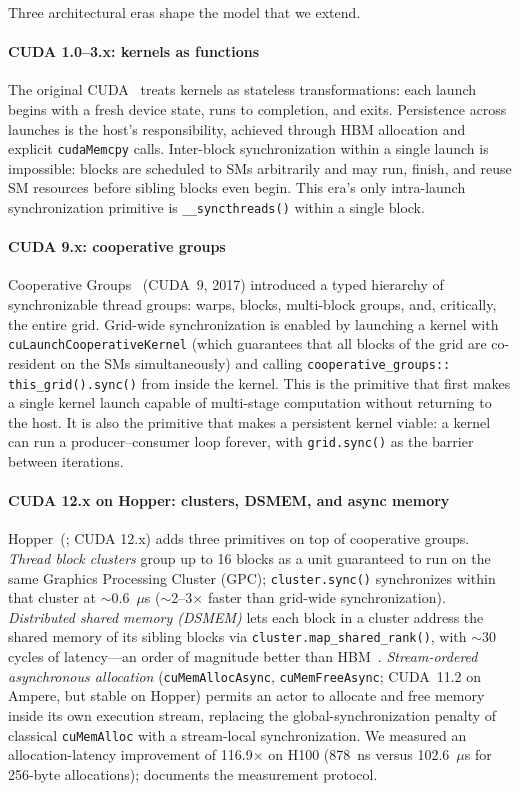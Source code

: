 Three architectural eras shape the model that we extend.

\paragraph{CUDA 1.0--3.x: kernels as functions}
The original CUDA~\citep{nickolls2008cuda} treats kernels as
stateless transformations: each launch begins with a fresh device
state, runs to completion, and exits.  Persistence across launches
is the host's responsibility, achieved through HBM allocation and
explicit \texttt{cudaMemcpy} calls.  Inter-block synchronization
within a single launch is impossible: blocks are scheduled to SMs
arbitrarily and may run, finish, and reuse SM resources before
sibling blocks even begin.  This era's only intra-launch
synchronization primitive is \texttt{\_\_syncthreads()} within a
single block.

\paragraph{CUDA 9.x: cooperative groups}
Cooperative Groups~\citep{nvidia2023cooperative} (CUDA~9, 2017)
introduced a typed hierarchy of synchronizable thread groups:
warps, blocks, multi-block groups, and, critically, the entire
grid.  Grid-wide synchronization is enabled by launching a kernel
with
\texttt{cuLaunch\allowbreak Cooperative\allowbreak Kernel} (which
guarantees that all blocks of the grid are co-resident on the SMs
simultaneously) and calling
\texttt{cooperative\_groups::\allowbreak
this\_grid().sync()} from inside the kernel.  This is the primitive that first makes a single kernel
launch capable of multi-stage computation without returning to the
host.  It is also the primitive that makes a persistent kernel
viable: a kernel can run a producer--consumer loop forever, with
\texttt{grid.sync()} as the barrier between iterations.

\paragraph{CUDA 12.x on Hopper: clusters, DSMEM, and async memory}
Hopper~(\citet{nvidia2022hopper}; CUDA 12.x) adds three primitives
on top of cooperative groups.  \emph{Thread block clusters} group up
to 16 blocks as a unit guaranteed to run on the same Graphics
Processing Cluster (GPC); \texttt{cluster.sync()} synchronizes within
that cluster at $\sim$0.6~$\mu$s ($\sim$2--3$\times$ faster than
grid-wide synchronization).  \emph{Distributed shared memory
(DSMEM)} lets each block in a cluster address the shared memory of
its sibling blocks via \texttt{cluster.map\_shared\_rank()}, with
$\sim$30 cycles of latency—an order of magnitude better than
HBM~\citep{nvidia2022hopper}.  \emph{Stream-ordered asynchronous
allocation} (\texttt{cuMemAllocAsync},
\texttt{cuMemFreeAsync}; CUDA~11.2 on Ampere, but stable on Hopper)
permits an actor to allocate and free memory inside its own
execution stream, replacing the global-synchronization penalty of
classical \texttt{cuMemAlloc} with a stream-local synchronization.
We measured an allocation-latency improvement of 116.9$\times$ on
H100 (878~ns versus 102.6~$\mu$s for 256-byte allocations);
 documents the measurement protocol.


